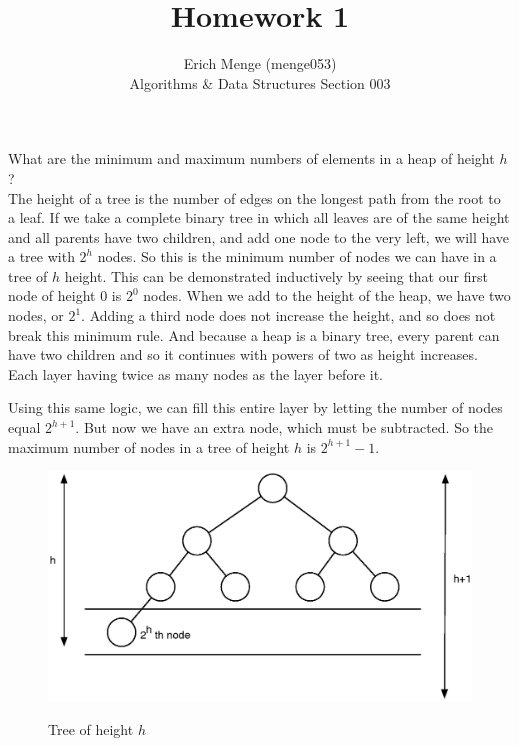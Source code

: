 \documentclass[12pt]{article}
\newenvironment{problem}[2][Problem]{\begin{trivlist}
\item[\hskip \labelsep {\bfseries #1}\hskip \labelsep {\bfseries #2.}]}{\end{trivlist}}
\begin{document}

\title{Homework 1}%
\author{Erich Menge (menge053) \\ %
Algorithms \& Data Structures Section 003} %

\maketitle

\begin{problem}{6.1-1} What are the minimum and maximum numbers of elements in a heap of height $h$? \\

    The height of a tree is the number of edges on the longest path from the root to a leaf. If we take a complete binary tree
    in which all leaves are of the same height and all parents have two children, and add one node to the very left, we will have
    a tree with $\boxed{2^{h}}$ nodes. So this is the minimum number of nodes we can have in a tree of $h$ height.
    This can be demonstrated inductively by seeing that our first node of height $0$ is $2^{0}$ nodes. When we add to the height
    of the heap, we have two nodes, or $2^1$. Adding a third node does not increase the height, and so does not break this minimum
    rule. And because a heap is a binary tree, every parent can have two children and so it continues with powers of two as height
    increases. Each layer having twice as many nodes as the layer before it.

    Using this same logic, we can fill this entire layer by letting the number of nodes equal $2^{h+1}$. But now we
    have an extra node, which must be subtracted. So the maximum number of nodes in a tree of height $h$ is $\boxed{2^{h+1} - 1}$.
    \begin{figure}[h!]
        \centering
        \caption{Tree of height $h$}
        \includegraphics[scale=.75]{bin_tree1.eps}
        \label{fig:bintree1}
    \end{figure}
\end{problem}
\end{document}
